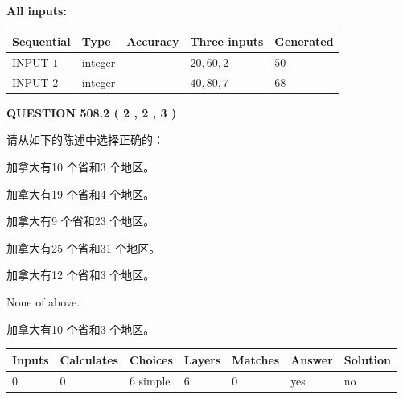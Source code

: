 \documentclass{ctexart}
\begin{document}
   
   
   
\noindent\vspace{0.1in}\hspace{-0.08in} {\textbf{\Large{All inputs: }}}
   
   
  
  
\noindent\begin{tabular}{|l|l|l|l|l|}
\hline
 Sequential & Type & Accuracy & Three inputs & Generated \\ 
\hline
 
 
  INPUT $  1 $ & integer &  & $
 20
 , 
 60
 , 
 2
 $ & $ 50 $ 
 \\  \hline  
 
 
  INPUT $  2 $ & integer &  & $
 40
 , 
 80
 , 
 7
 $ & $ 68 $ 
 \\  \hline  
 \end{tabular}
   
   
  
\vspace{0.2in}
  
{\textbf{\Large{QUESTION
508.2 
 ( 2 , 2 , 3 )
}}}
  
  
请从如下的陈述中选择正确的：
 
 
加拿大有10 个省和3 个地区。
 
 
加拿大有19 个省和4 个地区。
 
 
加拿大有9 个省和23 个地区。
 
 
加拿大有25 个省和31 个地区。
 
 
加拿大有12 个省和3 个地区。
 
 
 None of above.
 
 
\noindent{}
 
 
加拿大有10 个省和3 个地区。
 
 
\noindent{}
 
 
   
   
   
   
\noindent\begin{tabular}{|l|l|l|l|l|l|l|}
 \hline
Inputs & Calculates & Choices & Layers & Matches & Answer & Solution \\ \hline
 0  & 
 0  & 
 6
  simple  
  & 
 6  & 
 0  & 
  yes & 
  no 
  \\ \hline
 \end{tabular}
   
\end{document}
